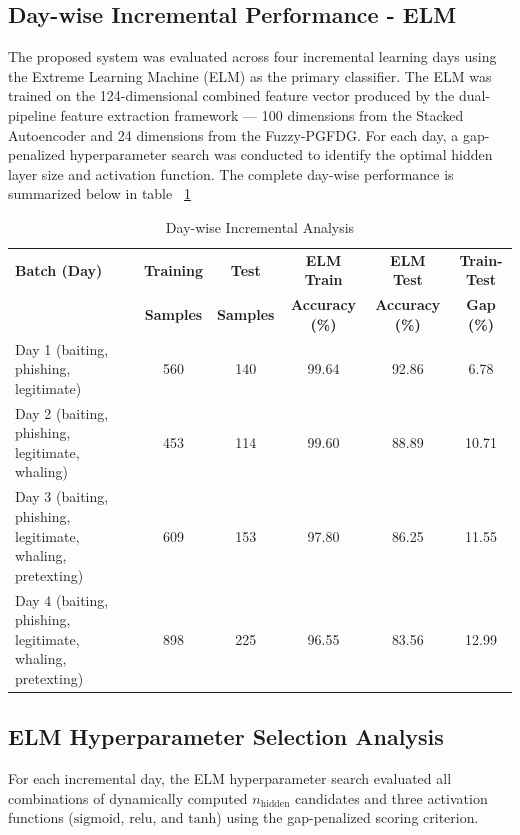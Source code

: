 \subsection{Day-wise Incremental Performance - ELM}
The proposed system was evaluated across four incremental learning days using the Extreme Learning Machine (ELM) as the primary classifier. The ELM was trained on the 124-dimensional combined feature vector produced by the dual-pipeline feature extraction framework — 100 dimensions from the Stacked Autoencoder and 24 dimensions from the Fuzzy-PGFDG. For each day, a gap-penalized hyperparameter search was conducted to identify the optimal hidden layer size and activation function. The complete day-wise performance is summarized below in table ~\ref{tab:daywise_incremental_analysis}

\begin{table}[h]
\centering
\caption{Day-wise Incremental Analysis}
\label{tab:daywise_incremental_analysis}
\small
\setlength{\tabcolsep}{4pt}
\begin{tabular}{|p{4.2cm}|c|c|c|c|c|}
\hline
\textbf{Batch (Day)} & \textbf{Training} & \textbf{Test} & \textbf{ELM Train} & \textbf{ELM Test} & \textbf{Train-Test} \\
 & \textbf{Samples} & \textbf{Samples} & \textbf{Accuracy (\%)} & \textbf{Accuracy (\%)} & \textbf{Gap (\%)} \\
\hline
Day 1 (baiting, phishing, legitimate) & 560 & 140 & 99.64 & 92.86 & 6.78 \\
\hline
Day 2 (baiting, phishing, legitimate, whaling) & 453 & 114 & 99.60 & 88.89 & 10.71 \\
\hline
Day 3 (baiting, phishing, legitimate, whaling, pretexting) & 609 & 153 & 97.80 & 86.25 & 11.55 \\
\hline
Day 4 (baiting, phishing, legitimate, whaling, pretexting) & 898 & 225 & 96.55 & 83.56 & 12.99 \\
\hline
\end{tabular}
\end{table}
\subsection{ELM Hyperparameter Selection Analysis}

\noindent
For each incremental day, the ELM hyperparameter search evaluated all combinations of dynamically computed $n_{\text{hidden}}$ candidates and three activation functions ($\text{sigmoid}$, $\text{relu}$, and $\text{tanh}$) using the gap-penalized scoring criterion.

